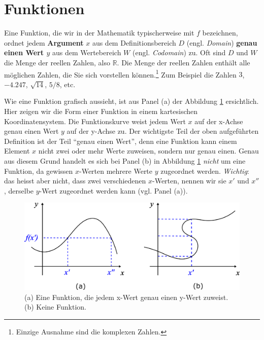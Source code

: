 \documentclass[
]{book}
\begin{document}
\hypertarget{funktionen}{%
\section{Funktionen}\label{funktionen}}

Eine Funktion, die wir in der Mathematik typischerweise mit \(f\) bezeichnen, ordnet jedem \textbf{Argument} \(x\) aus dem Definitionsbereich \(D\) (engl. \emph{Domain}) \textbf{genau einen Wert \(y\)} aus dem Wertebereich \(W\) (engl. \emph{Codomain}) zu. Oft sind \(D\) und \(W\) die Menge der reellen Zahlen, also \(\mathbb{R}\). Die Menge der reellen Zahlen enthält alle möglichen Zahlen, die Sie sich vorstellen können.\footnote{Einzige Ausnahme sind die komplexen Zahlen.} Zum Beispiel die Zahlen \(3\), \(-4.247\), \(\sqrt{14}\), \(5/8\), etc.

Wie eine Funktion grafisch aussieht, ist aus Panel (a) der Abbildung \ref{fig:functions} ersichtlich. Hier zeigen wir die Form einer Funktion in einem kartesischen Koordinatensystem. Die Funktionskurve weist jedem Wert \(x\) auf der x-Achse genau einen Wert \(y\) auf der y-Achse zu. Der wichtigste Teil der oben aufgeführten Definition ist der Teil ``genau einen Wert'', denn eine Funktion kann einem Element \(x\) nicht zwei oder mehr Werte zuweisen, sondern nur genau einen. Genau aus diesem Grund handelt es sich bei Panel (b) in Abbildung \ref{fig:functions} \emph{nicht} um eine Funktion, da gewissen \(x\)-Werten mehrere Werte \(y\) zugeordnet werden. \emph{Wichtig}: das heisst aber nicht, dass zwei verschiedenen \(x\)-Werten, nennen wir sie \(x'\) und \(x''\), derselbe \(y\)-Wert zugeordnet werden kann (vgl. Panel (a)).

\begin{figure}

{\centering \includegraphics[width=0.8\linewidth]{images/Functions} 

}

\caption{(a) Eine Funktion, die jedem x-Wert genau einen y-Wert zuweist. (b) Keine Funktion. }\label{fig:functions}
\end{figure}
\end{document}
